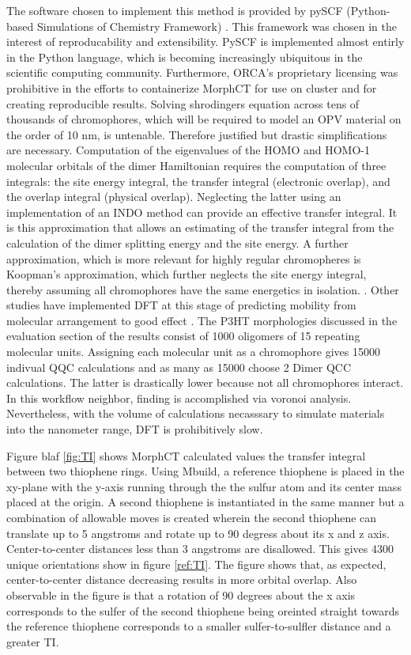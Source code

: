 \indent The software chosen to implement this method is
provided by pySCF (Python-based Simulations of Chemistry Framework) \cite{Sun2018a}. This framework
was chosen in the interest of reproducability and extensibility. PySCF is implemented almost entirly in the Python 
language, which is becoming increasingly ubiquitous in the scientific computing community. Furthermore,
ORCA's proprietary licensing was prohibitive in the efforts to containerize MorphCT for use on cluster and for
creating reproducible results. 
Solving shrodingers equation across tens of thousands of 
chromophores, which will be required to model an OPV material on the order of 10 nm, is untenable. Therefore
justified but drastic simplifications are necessary. Computation of the eigenvalues of the HOMO and HOMO-1
molecular orbitals of the dimer Hamiltonian requires the computation of three integrals: 
the site energy integral, the transfer integral (electronic overlap), and the overlap integral (physical
overlap). Neglecting the latter using an implementation of an INDO method can provide an effective transfer
integral. It is this approximation that allows an estimating of the transfer integral from the calculation of
the dimer splitting energy and the site energy. A further approximation, which is more relevant for highly regular chromopheres is Koopman's
approximation, which further neglects the site energy integral, thereby assuming all chromophores have the same
energetics in isolation.  \cite{Huang2005b}. Other studies have implemented DFT at this stage of predicting
mobility from molecular arrangement to good effect \cite{Deng2004}. The P3HT morphologies discussed in the evaluation section of the results
consist of 1000 oligomers of 15 repeating molecular units. Assigning each molecular unit as a chromophore
gives 15000 indivual QQC calculations and as many as 15000 choose 2 Dimer QCC calculations. The latter is
drastically lower because not all chromophores interact. In this workflow neighbor, finding is accomplished via
voronoi analysis. Nevertheless, with the volume of calculations necasssary to simulate materials into the
nanometer range, DFT is prohibitively slow. 

Figure blaf \ref{fig:TI} shows MorphCT calculated values the transfer integral between two thiophene
rings. Using Mbuild, a reference thiophene is placed in the xy-plane with the y-axis running through the 
the sulfur atom and its center mass placed at the origin. A second thiophene is instantiated in the same manner but a
combination of allowable moves is created wherein the second thiophene can translate up to 5 angstroms 
and rotate up to 90 degress about its x and z axis. Center-to-center distances less than 3 angstroms are disallowed. 
This gives 4300 unique orientations show in figure \ref{ref:TI}. The figure shows that, as expected,
center-to-center distance decreasing results in more orbital overlap. Also observable in the figure is that
a rotation of 90 degrees about the x axis corresponds to the sulfer of the second thiophene being oreinted
straight towards the reference thiophene corresponds to a smaller sulfer-to-sulfler distance and a greater TI. 

